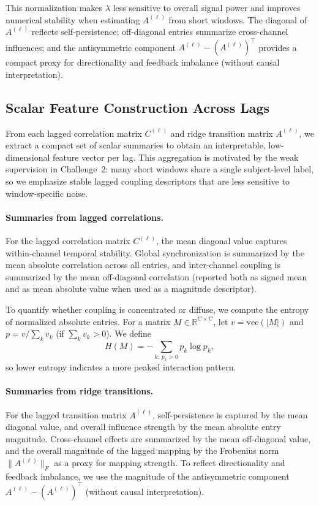 \documentclass[12pt]{article}
\begin{document}
This normalization makes $\lambda$ less sensitive to overall signal power and improves numerical stability when estimating
$A^{(\ell)}$ from short windows. The diagonal of $A^{(\ell)}$ reflects self-persistence; off-diagonal entries summarize
cross-channel influences; and the antisymmetric component $A^{(\ell)}-(A^{(\ell)})^\top$ provides a compact proxy for
directionality and feedback imbalance (without causal interpretation).

\subsection{Scalar Feature Construction Across Lags}
\label{sec:ch2_scalar_features}

From each lagged correlation matrix $C^{(\ell)}$ and ridge transition matrix $A^{(\ell)}$, we extract a compact set of
scalar summaries to obtain an interpretable, low-dimensional feature vector per lag. This aggregation is motivated by
the weak supervision in Challenge~2: many short windows share a single subject-level label, so we emphasize stable
lagged coupling descriptors that are less sensitive to window-specific noise.

\paragraph{Summaries from lagged correlations.}
For the lagged correlation matrix $C^{(\ell)}$, the mean diagonal value captures within-channel temporal stability.
Global synchronization is summarized by the mean absolute correlation across all entries, and inter-channel coupling is
summarized by the mean off-diagonal correlation (reported both as signed mean and as mean absolute value when used as a
magnitude descriptor).

To quantify whether coupling is concentrated or diffuse, we compute the entropy of normalized absolute entries. For a
matrix $M\in\mathbb{R}^{C\times C}$, let $v=\mathrm{vec}(|M|)$ and $p=v/\sum_k v_k$ (if $\sum_k v_k>0$). We define
\begin{equation}
\label{eq:ext_entropy}
H(M)=-\sum_{k:\,p_k>0} p_k \log p_k,
\end{equation}
so lower entropy indicates a more peaked interaction pattern.

\paragraph{Summaries from ridge transitions.}
For the lagged transition matrix $A^{(\ell)}$, self-persistence is captured by the mean diagonal value, and overall
influence strength by the mean absolute entry magnitude. Cross-channel effects are summarized by the mean off-diagonal
value, and the overall magnitude of the lagged mapping by the Frobenius norm $\|A^{(\ell)}\|_F$ as a proxy for mapping
strength. To reflect directionality and feedback imbalance, we use the magnitude of the antisymmetric component
$A^{(\ell)}-(A^{(\ell)})^\top$ (without causal interpretation).
\end{document}
